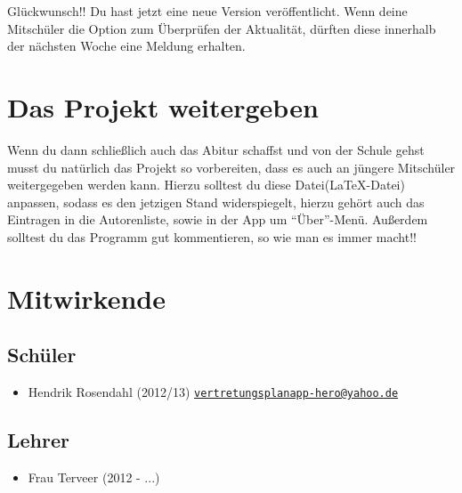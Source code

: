 \documentclass[12pt,headsepline]{scrartcl}
\begin{document}
 Glückwunsch!! Du hast jetzt eine neue Version veröffentlicht. Wenn deine Mitschüler die Option zum Überprüfen der Aktualität, dürften diese innerhalb der nächsten Woche eine Meldung erhalten.

\section{Das Projekt weitergeben}
Wenn du dann schließlich auch das Abitur schaffst und von der Schule gehst musst du natürlich das Projekt so vorbereiten, dass es auch an jüngere Mitschüler weitergegeben werden kann. Hierzu solltest du diese Datei(\LaTeX-Datei) anpassen, sodass es den jetzigen Stand widerspiegelt, hierzu gehört auch das Eintragen in die Autorenliste, sowie in der App um ``Über''-Menü. Außerdem solltest du das Programm gut kommentieren, so wie man es immer macht!!

\section{Mitwirkende}
\subsection{Schüler}
\begin{itemize}
 \item Hendrik Rosendahl (2012/13) \href{mailto:vertretungsplanapp-hero@yahoo.de?subject=Vertretungsplan-App}{\texttt{vertretungsplanapp-hero@yahoo.de}}
\end{itemize}
\subsection{Lehrer}
\begin{itemize}
 \item Frau Terveer (2012 - ...)
\end{itemize}
\end{document}
